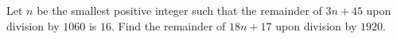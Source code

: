 Let $n$ be the smallest positive integer such that the remainder of $3n+45$ upon division by $1060$ is $16$. Find the remainder of $18n+17$ upon division by $1920$.
